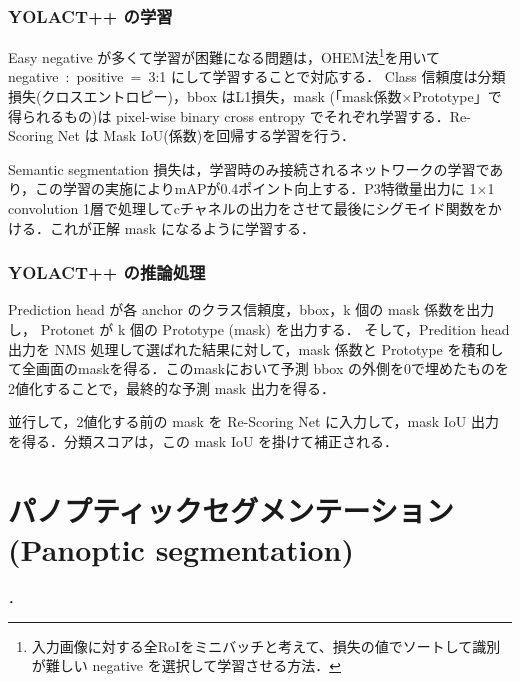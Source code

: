 \documentclass[twocolumn]{jsarticle} %
\begin{document}
\subsubsection{YOLACT++ の学習}
Easy negative が多くて学習が困難になる問題は，OHEM法\footnote[3]{入力画像に対する全RoIをミニバッチと考えて、損失の値でソートして識別が難しい negative を選択して学習させる方法．}を用いて negative~:~positive~=~3:1 にして学習することで対応する．
Class 信頼度は分類損失(クロスエントロピー)，bbox はL1損失，mask (「mask係数×Prototype」で得られるもの)は pixel-wise binary cross entropy でそれぞれ学習する．Re-Scoring Net は Mask IoU(係数)を回帰する学習を行う．

Semantic segmentation 損失は，学習時のみ接続されるネットワークの学習であり，この学習の実施によりmAPが0.4ポイント向上する．P3特徴量出力に 1{$\times$}1 convolution 1層で処理してcチャネルの出力をさせて最後にシグモイド関数をかける．これが正解 mask になるように学習する．

\subsubsection{YOLACT++ の推論処理}
Prediction head が各 anchor のクラス信頼度，bbox，k 個の mask 係数を出力し，
Protonet が k 個の Prototype (mask) を出力する．
そして，Predition head 出力を NMS 処理して選ばれた結果に対して，mask 係数と Prototype を積和して全画面のmaskを得る．このmaskにおいて予測 bbox の外側を0で埋めたものを2値化することで，最終的な予測 mask 出力を得る．

並行して，2値化する前の mask を Re-Scoring Net に入力して，mask IoU 出力を得る．分類スコアは，この mask IoU を掛けて補正される．
\section{パノプティックセグメンテーション(Panoptic segmentation)}
\cite{KHGRD19}．
\end{document}
